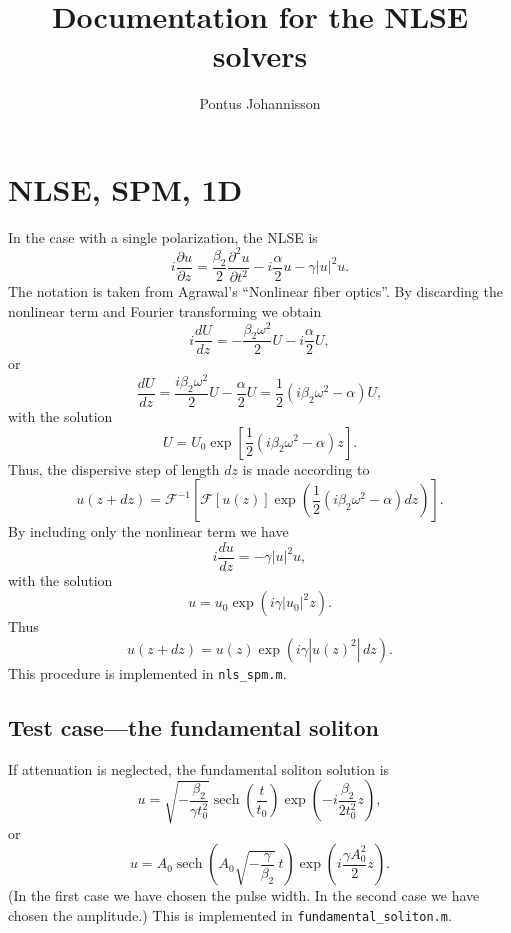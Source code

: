 \documentclass[a4paper, 11pt]{article}
\title{Documentation for the NLSE solvers}
\author{Pontus Johannisson}
\newcommand{\od}[2]{\frac{d#1}{d#2}}
\newcommand{\pdn}[3]{\frac{\partial^{#3}#1}{\partial#2^{#3}}}
\newcommand{\pd}[2]{\frac{\partial#1}{\partial#2}}
\newcommand{\sech}{\operatorname{sech}}
\newcommand{\fourier}{\mathcal{F}}
\newcommand{\invfourier}{\mathcal{F}^{-1}}
\begin{document}
\maketitle

\section{NLSE, SPM, 1D}
In the case with a single polarization, the NLSE is
\begin{equation}
i \pd{u}{z} = \frac{\beta_2}{2} \pdn{u}{t}{2} - i \frac{\alpha}{2} u -
\gamma |u|^2 u .
\end{equation}
The notation is taken from Agrawal's ``Nonlinear fiber optics''. By
discarding the nonlinear term and Fourier transforming we obtain
\begin{equation}
i \od{U}{z} = -\frac{\beta_2 \omega^2}{2} U - i \frac{\alpha}{2} U,
\end{equation}
or
\begin{equation}
\od{U}{z} = \frac{i \beta_2 \omega^2}{2} U - \frac{\alpha}{2} U =
\frac{1}{2} ( i \beta_2 \omega^2 - \alpha ) U,
\end{equation}
with the solution
\begin{equation}
U = U_0 \exp \left[ \frac{1}{2} ( i \beta_2 \omega^2 - \alpha ) z
\right].
\end{equation}
Thus, the dispersive step of length $dz$ is made according to
\begin{equation}
u(z + dz) = \invfourier \left[ \fourier[u(z)] \exp \left( \frac{1}{2}
  ( i \beta_2 \omega^2 - \alpha ) dz \right) \right].
\end{equation}
By including only the nonlinear term we have
\begin{equation}
i \od{u}{z} = - \gamma |u|^2 u,
\end{equation}
with the solution
\begin{equation}
u = u_0 \exp (i \gamma |u_0|^2 z).
\end{equation}
Thus
\begin{equation}
u(z + dz) = u(z) \exp (i \gamma |u(z)^2| \, dz).
\end{equation}
This procedure is implemented in {\texttt{nls\_spm.m}}.



\subsection{Test case---the fundamental soliton}
If attenuation is neglected, the fundamental soliton solution is
\begin{equation}
u = \sqrt{-\frac{\beta_2}{\gamma t_0^2}} \sech \left( \frac{t}{t_0}
\right) \exp \left( -i \frac{\beta_2}{2 t_0^2} z \right),
\end{equation}
or
\begin{equation}
u = A_0 \sech \left( A_0 \sqrt{-\frac{\gamma}{\beta_2}} \, t \right)
\exp \left( i \frac{\gamma A_0^2}{2} z \right).
\end{equation}
(In the first case we have chosen the pulse width. In the second case
we have chosen the amplitude.) This is implemented in
{\texttt{fundamental\_soliton.m}}.
\end{document}
